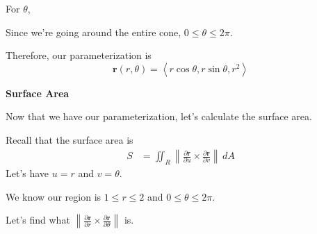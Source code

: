 \documentclass{article}
\newcommand{\lra}[1]{\left\langle #1 \right\rangle}
\newcommand{\norm}[1]{\left\lVert #1 \right\rVert}
\renewcommand{\r}[0]{\mathbf{r}}
\begin{document}
For $\theta$,

Since we're going around the entire cone, $0\leq \theta\leq 2\pi$.

Therefore, our parameterization is
\begin{equation*}
    \r(r,\theta)=\lra{r\cos\theta, r\sin\theta, r^2}\tag{$1\leq r\leq 2$, $0\leq \theta\leq 2\pi$}
\end{equation*}
{}\textbf{Surface Area}

Now that we have our parameterization, let's calculate the surface area.

Recall that the surface area is
\begin{align*}
    S&=\iint_R \norm{\frac{\partial \r}{\partial u}\times \frac{\partial \r}{\partial v}}\,dA
\end{align*}
Let's have $u=r$ and $v=\theta$.

We know our region is $1\leq r\leq 2$ and $0\leq \theta\leq 2\pi$.

Let's find what $\displaystyle\norm{\frac{\partial \r}{\partial r}\times \frac{\partial \r}{\partial \theta}} $ is.
\end{document}
